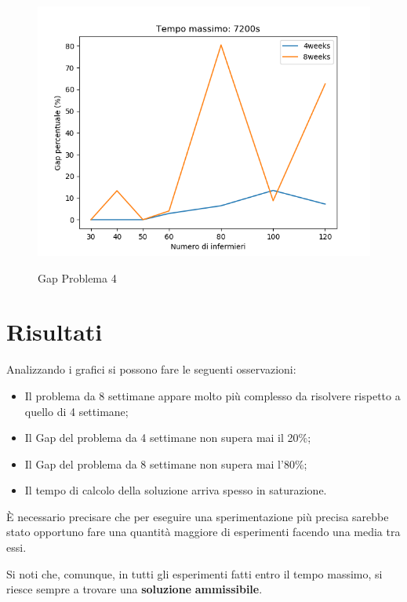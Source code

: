 \begin{figure}[H]
\begin{center}
  \includegraphics[scale=0.5]{img/Problema4/Gap_2h-h1_w4.png}\\
  \caption{Gap Problema 4}
\end{center}
\end{figure}

\newpage 
\section{Risultati}
Analizzando i grafici si possono fare le seguenti osservazioni:
\begin{itemize}
\item Il problema da 8 settimane appare molto più complesso da risolvere rispetto a quello di 4 settimane;
\item Il Gap del problema da 4 settimane non supera mai il 20\%;
\item Il Gap del problema da 8 settimane non supera mai l'80\%;
\item Il tempo di calcolo della soluzione arriva spesso in saturazione.
\end{itemize}

È necessario precisare che per eseguire una sperimentazione più precisa sarebbe stato opportuno fare una quantità maggiore di esperimenti facendo una media tra essi.

Si noti che, comunque, in tutti gli esperimenti fatti entro il tempo massimo, si riesce sempre a trovare una \textbf{soluzione} \textbf{ammissibile}.